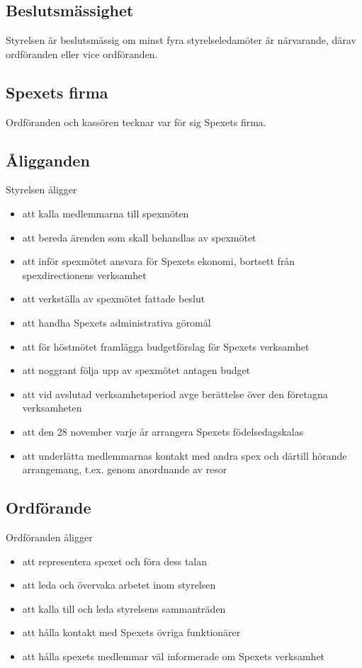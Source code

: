 \documentclass[a4paper]{article}
\begin{document}
\subsection{Beslutsmässighet}
Styrelsen är beslutsmässig om minst fyra styrelseledamöter är närvarande, därav ordföranden eller vice ordföranden.

\subsection{Spexets firma}
Ordföranden och kassören tecknar var för sig Spexets firma.

\subsection{Åligganden}
Styrelsen åligger

\begin{itemize}
  \item att kalla medlemmarna till spexmöten
  \item att bereda ärenden som skall behandlas av spexmötet
  \item att inför spexmötet ansvara för Spexets ekonomi, bortsett från spexdirectionens verksamhet
  \item att verkställa av spexmötet fattade beslut
  \item att handha Spexets administrativa göromål
  \item att för höstmötet framlägga budgetförslag för Spexets verksamhet
  \item att noggrant följa upp av spexmötet antagen budget
  \item att vid avslutad verksamhetsperiod avge berättelse över den företagna verksamheten
  \item att den 28 november varje år arrangera Spexets födelsedagskalas
  \item att underlätta medlemmarnas kontakt med andra spex och därtill hörande arrangemang, t.ex. genom anordnande av resor
\end{itemize}

\subsection{Ordförande}
Ordföranden åligger

\begin{itemize}
  \item att representera spexet och föra dess talan
  \item att leda och övervaka arbetet inom styrelsen
  \item att kalla till och leda styrelsens sammanträden
  \item att hålla kontakt med Spexets övriga funktionärer
  \item att hålla spexets medlemmar väl informerade om Spexets verksamhet
\end{itemize}
\end{document}
